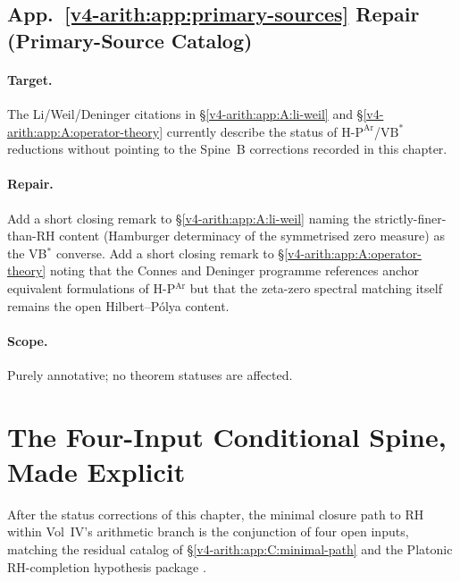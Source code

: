 \subsection{App.~\ref{v4-arith:app:primary-sources} Repair (Primary-Source Catalog)}
\label{v4-arith:w3-audit-B:repair-A}

\paragraph{Target.} The Li/Weil/Deninger citations in
\S\ref{v4-arith:app:A:li-weil} and
\S\ref{v4-arith:app:A:operator-theory} currently describe the
status of \(\mathrm{H}\text{-}\mathrm{P}^{\mathrm{Ar}}\)/\(\mathrm{VB}^{*}\)
reductions without pointing to the Spine~B corrections recorded
in this chapter.

\paragraph{Repair.} Add a short closing remark to
\S\ref{v4-arith:app:A:li-weil} naming the strictly-finer-than-RH
content (Hamburger determinacy of the symmetrised zero measure) as
the VB\(^{*}\) converse. Add a short closing remark to
\S\ref{v4-arith:app:A:operator-theory} noting that the Connes and
Deninger programme references anchor equivalent formulations of
H-P\(^{\mathrm{Ar}}\) but that the zeta-zero spectral matching
itself remains the open Hilbert--P\'olya content.

\paragraph{Scope.} Purely annotative; no theorem statuses are
affected.

\section{The Four-Input Conditional Spine, Made Explicit}
\label{v4-arith:w3-audit-B:four-input-spine}

After the status corrections of this chapter, the minimal closure
path to RH within Vol~IV's arithmetic branch is the conjunction of
four open inputs, matching the residual catalog of
\S\ref{v4-arith:app:C:minimal-path} and the Platonic RH-completion
hypothesis package .

